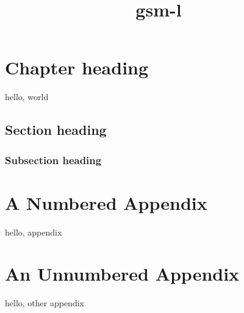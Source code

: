 \documentclass{gsm-l}
\title{gsm-l}
\begin{document}
\frontmatter

\maketitle

\tableofcontents

\chapter{Chapter heading}

hello, world

\section{Section heading}

\subsection{Subsection heading}

\appendix

\chapter{A Numbered Appendix}

hello, appendix

\chapter*{An Unnumbered Appendix}

hello, other appendix
\end{document}
